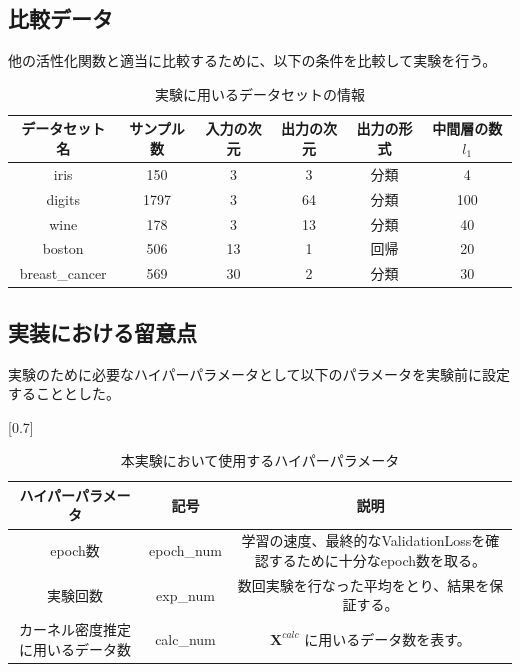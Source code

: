 \subsection{比較データ}

他の活性化関数と適当に比較するために、以下の条件を比較して実験を行う。


\begin{table}[htbp]
    \begin{center}
        \caption{実験に用いるデータセットの情報}
        \label{dataset_name}
        \vspace{2mm} 
        \begin{tabular}{ |c|c|c|c|c|c| }
        データセット名 & サンプル数 & 入力の次元 & 出力の次元 & 出力の形式 & 中間層の数 $ {l_1} $ \\
        \hline
        iris           & 150    & 3         & 3        & 分類      & 4 \\
        digits         & 1797   & 3         & 64       & 分類      & 100 \\
        wine           & 178    & 3         & 13       & 分類      & 40 \\
        boston         & 506    & 13        & 1        & 回帰      & 20 \\
        breast\_cancer & 569    & 30        & 2        & 分類      & 30 \\
        \end{tabular}
    \end{center}
\end{table}


\subsection{実装における留意点}
実験のために必要なハイパーパラメータとして以下のパラメータを実験前に設定することとした。

\begin{table}[htbp]
    \begin{center}
        \caption{本実験において使用するハイパーパラメータ}
        \vspace{2mm} 
        \scalebox{0.7}[0.7]{
            \begin{tabular}{||c | c |c||}
            ハイパーパラメータ & 記号 & 説明 \\
            \hline
            epoch数                           & epoch\_num      & 学習の速度、最終的なValidationLossを確認するために十分なepoch数を取る。  \\
            実験回数                           & exp\_num     & 数回実験を行なった平均をとり、結果を保証する。 \\
            カーネル密度推定に用いるデータ数        & calc\_num           & $ \mathbf{X}^{calc} $ に用いるデータ数を表す。  \\
            \end{tabular}
        }
    \end{center}
\end{table}

